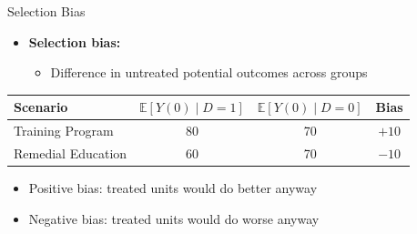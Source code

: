 \documentclass[12pt, compress]{beamer}
\begin{document}
\begin{frame}{Selection Bias}

\begin{itemize}
	\item \textbf{Selection bias:}
	\begin{itemize}
		\item Difference in untreated potential outcomes across groups
	\end{itemize}
\end{itemize}

\begin{center}
\begin{tabular}{lccc}
	\hline
	\textbf{Scenario} & $\mathbb{E}[Y(0)\mid D=1]$ & $\mathbb{E}[Y(0)\mid D=0]$ & \textbf{Bias} \\
	\hline
	Training Program & 80 & 70 & $+10$ \\
	Remedial Education & 60 & 70 & $-10$ \\
	\hline
\end{tabular}
\end{center}

\medskip

\begin{itemize}
	\item Positive bias: treated units would do better anyway
	\item Negative bias: treated units would do worse anyway
\end{itemize}

\end{frame}
\end{document}
